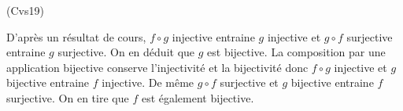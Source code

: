 \begin{tiny}(Cvs19)\end{tiny} D'après un résultat de cours, $f\circ g$ injective entraine $g$ injective et $g \circ f$ surjective entraine $g$ surjective. On en déduit que $g$ est bijective. La composition par une application bijective conserve l'injectivité et la bijectivité donc $f\circ g$ injective et $g$ bijective entraine $f$ injective. De même $g \circ f$ surjective et $g$ bijective entraine $f$ surjective. On en tire que $f$ est également bijective.